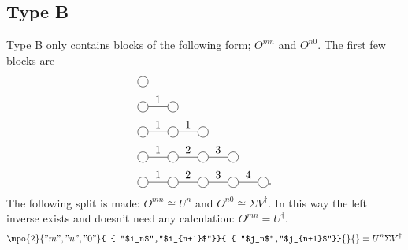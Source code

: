 \subsection{Type B}

Type B only contains blocks of the following form; $O^{m n}$ and $O^{n 0}$. The first few blocks are
\begin{equation}
    \begin{split}
        &\mpob{1}{ {,}  }{}{}{}{{,,}} \\
        &\mpob{2}{ {,"1",}  }{}{}{}{{,,}}\\
        &\mpob{3}{ {,"1","1",}  }{}{}{}{{,,,}}\\
        &\mpob{4}{ {,"1","2","3",}  }{}{}{}{{,,,,,}}\\
        &\mpob{5}{ {,"1","2","3","4",}  }{}{}{}{{,,,,,}}.
    \end{split}
\end{equation}
The following split is made: $O^{m n} \cong U^n$ and $O^{n 0} \cong  \Sigma V^{\dagger}$. In this way the left inverse exists and doesn't need any calculation: $O^{m n} = U^{\dagger}$.
\def \rhs{\expH{2}{ $L_{m}^{-1}  M_{n+1} $ }{{"$i_n$","$i_{n+1}$"}}{{"$j_n$","$j_{n+1}$"}}{{"m","0"}}  }
\begin{equation}
    \begin{split}
        \mpo{2}{ {"m","n","0"}  }{ { "$i_n$","$i_{n+1}$"}}{ { "$j_n$","$j_{n+1}$"}}{}{} =  U^n  \Sigma V^{\dagger}\\
    \end{split}
\end{equation}

